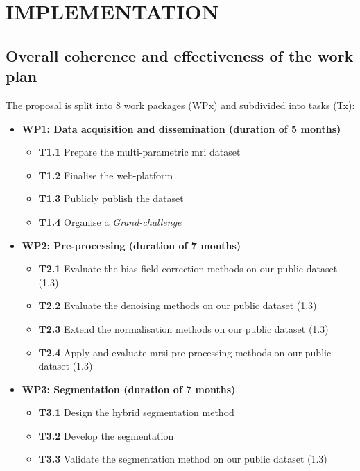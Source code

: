 \section{IMPLEMENTATION}
\label{sec:implementation}

\subsection{Overall coherence and effectiveness of the work plan}

The proposal is split into 8 work packages (WPx) and subdivided into tasks (Tx):

\begin{itemize}[noitemsep]
\item[] \textbf{WP1: Data acquisition and dissemination (duration of 5 months)}
  \begin{itemize}[noitemsep,nolistsep]
  \item[] \textbf{T1.1} Prepare the multi-parametric \ac{mri} dataset
  \item[] \textbf{T1.2} Finalise the web-platform
  \item[] \textbf{T1.3} Publicly publish the dataset
  \item[] \textbf{T1.4} Organise a \emph{Grand-challenge}
  \end{itemize}
\item[] \textbf{WP2: Pre-processing (duration of 7 months)}
  \begin{itemize}[noitemsep,nolistsep]
  \item[] \textbf{T2.1} Evaluate the bias field correction methods on our public dataset (1.3)
  \item[] \textbf{T2.2} Evaluate the denoising methods on our public dataset (1.3)
  \item[] \textbf{T2.3} Extend the normalisation methods on our public dataset (1.3)
  \item[] \textbf{T2.4} Apply and evaluate \ac{mrsi} pre-processing methods on our public dataset (1.3)
  \end{itemize}
\item[] \textbf{WP3: Segmentation (duration of 7 months)}
  \begin{itemize}[noitemsep,nolistsep]
  \item[] \textbf{T3.1} Design the hybrid segmentation method
  \item[] \textbf{T3.2} Develop the segmentation
  \item[] \textbf{T3.3} Validate the segmentation method on our public dataset (1.3)

\end{itemize}
\end{itemize}
